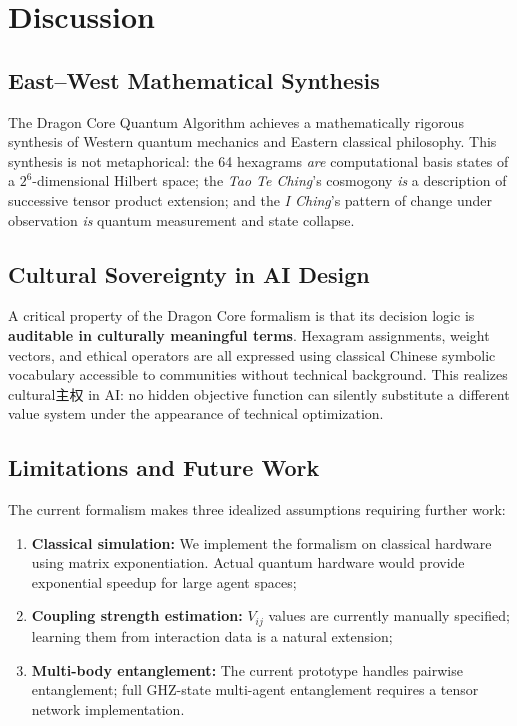 \documentclass[conference]{IEEEtran}
\begin{document}
\section{Discussion}

\subsection{East–West Mathematical Synthesis}

The Dragon Core Quantum Algorithm achieves a mathematically
rigorous synthesis of Western quantum mechanics and
Eastern classical philosophy. This synthesis is not
metaphorical: the 64 hexagrams \textit{are} computational
basis states of a $2^6$-dimensional Hilbert space; the
\textit{Tao Te Ching}'s cosmogony \textit{is} a description
of successive tensor product extension; and the
\textit{I Ching}'s pattern of change under observation
\textit{is} quantum measurement and state collapse.

\subsection{Cultural Sovereignty in AI Design}

A critical property of the Dragon Core formalism is
that its decision logic is \textbf{auditable in
culturally meaningful terms}. Hexagram assignments,
weight vectors, and ethical operators are all expressed
using classical Chinese symbolic vocabulary accessible
to communities without technical background. This
realizes cultural主权 in AI: no hidden objective
function can silently substitute a different value system
under the appearance of technical optimization.

\subsection{Limitations and Future Work}

The current formalism makes three idealized assumptions
requiring further work:
\begin{enumerate}
  \item \textbf{Classical simulation:} We implement
        the formalism on classical hardware using
        matrix exponentiation. Actual quantum hardware
        would provide exponential speedup for large
        agent spaces;
  \item \textbf{Coupling strength estimation:}
        $V_{ij}$ values are currently manually specified;
        learning them from interaction data is a
        natural extension;
  \item \textbf{Multi-body entanglement:} The current
        prototype handles pairwise entanglement;
        full GHZ-state multi-agent entanglement requires
        a tensor network implementation.
\end{enumerate}
\end{document}
